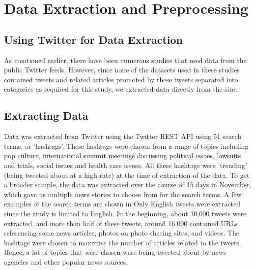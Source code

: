 \section{Data Extraction and Preprocessing}

\subsection{Using Twitter for Data Extraction}

As mentioned earlier, there have been numerous studies that used data from the public Twitter feeds. However, since none of the datasets used in these studies contained tweets and related articles promoted by these tweets separated into categories as required for this study, we extracted data directly from the site.

\subsection{Extracting Data}

Data was extracted from Twitter using the Twitter REST API using 51 search terms, or ‘hashtags’. These hashtags were chosen from a range of topics including pop culture,  international summit meetings discussing political issues, lawsuits and trials, social issues and health care issues. All these hashtags were ‘trending’ (being tweeted about at a high rate) at the time of extraction of the data. To get a broader sample, the data was extracted over the course of 15 days in November, which gave us multiple news stories to choose from for the search terms. A few examples of the search terms are shown in  Only English tweets were extracted since the study is limited to English. In the beginning, about 30,000 tweets were extracted, and more than half of these tweets, around 16,000 contained URLs referencing some news articles, photos on photo sharing sites, and videos. The hashtags were chosen to maximise the number of articles related to the tweets. Hence, a lot of topics that were chosen were being tweeted about by news agencies and other popular news sources. 

